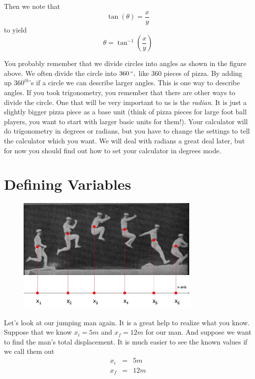 \documentclass[]{Book}
\begin{document}
Then we note that 
\begin{equation}
	\tan \left( \theta \right) =\frac{x}{y}
\end{equation}%
to yield%
\begin{equation}
	\theta =\tan ^{-1}\left( \frac{x}{y}\right)
\end{equation}

You probably remember that we divide circles into angles as shown in the
figure above. We often divide the circle into $360\unit{%
	{{}^\circ}%
},$ like 360 pieces of pizza. By adding up $360^{th}$'s if a circle we can
describe larger angles. This is one way to describe angles. If you took
trigonometry, you remember that there are other ways to divide the circle.
One that will be very important to us is the \emph{radian}. It is just a
slightly bigger pizza piece as a base unit (think of pizza pieces for large
foot ball players, you want to start with larger basic units for them!).
Your calculator will do trigonometry in degrees or radians, but you have to
change the settings to tell the calculator which you want. We will deal with
radians a great deal later, but for now you should find out how to set your
calculator in degrees mode.

\section{Defining Variables}

\begin{figure}[h!]
	\begin{center}
		\includegraphics[width=0.8\textwidth]{Jumping_Man}			
		\label{fig:Jumping_Man}
	\end{center}
\end{figure}

Let's look at our jumping man again. It is a great help to realize what you
know. Suppose that we know $x_{i}=5\unit{m}$ and $x_{f}=12\unit{m}$ for our
man. And suppose we want to find the man's total displacement. It is much
easier to see the known values if we call them out 
\begin{eqnarray*}
	x_{i} &=&5\unit{m} \\
	x_{f} &=&12\unit{m}
\end{eqnarray*}
\end{document}
